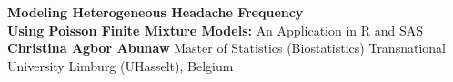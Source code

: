 \documentclass[a4paper,12pt]{article}
\begin{document}
\begin{titlepage}
\begin{center}
\vspace*{2.5cm}
{\LARGE\bfseries Modeling Heterogeneous Headache Frequency\\[0.2cm] Using Poisson Finite Mixture Models:}
\vspace{0.5cm}
{\Large An Application in R and SAS}
\vfill
{\Large\bfseries Christina Agbor Abunaw}
\vspace{1.5cm}
{\large Master of Statistics (Biostatistics)}
\vspace{0.3cm}
{\large Transnational University Limburg (UHasselt), Belgium}
\vfill
\end{center}
\thispagestyle{empty}
\end{titlepage}

\clearpage
\tableofcontents
\clearpage
{}

\clearpage

\clearpage

\clearpage

\clearpage

\clearpage

\clearpage

\clearpage


\end{document}
